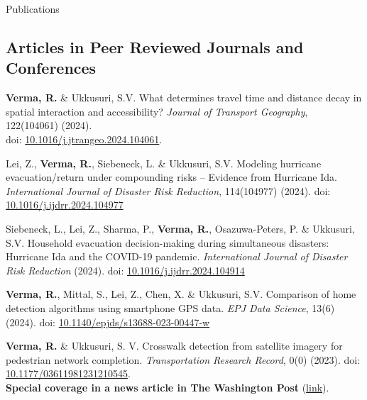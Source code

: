 \documentclass{CV} %
\begin{document}
\begin{rSection}{Publications}
    \subsection*{Articles in Peer Reviewed Journals and Conferences}
    \begin{etaremune}
        \item \textbf{Verma, R.} \& Ukkusuri, S.V. What determines travel time and distance decay in spatial interaction and accessibility? \textit{Journal of Transport Geography}, 122(104061) (2024).\\doi: \href{https://doi.org/10.1016/j.jtrangeo.2024.104061}{10.1016/j.jtrangeo.2024.104061}.

        \item Lei, Z., \textbf{Verma, R.}, Siebeneck, L. \& Ukkusuri, S.V. Modeling hurricane evacuation/return under compounding risks – Evidence from Hurricane Ida.  \textit{International Journal of Disaster Risk Reduction}, 114(104977) (2024). doi: \href{https://doi.org/10.1016/j.ijdrr.2024.104977}{10.1016/j.ijdrr.2024.104977}

        \item Siebeneck, L., Lei, Z., Sharma, P., \textbf{Verma, R.}, Osazuwa-Peters, P. \& Ukkusuri, S.V. Household evacuation decision-making during simultaneous disasters: Hurricane Ida and the COVID-19 pandemic.
        \textit{International Journal of Disaster Risk Reduction} (2024). doi: \href{https://doi.org/10.1016/j.ijdrr.2024.104914}{10.1016/j.ijdrr.2024.104914}

        \item \textbf{Verma, R.}, Mittal, S., Lei, Z., Chen, X. \& Ukkusuri, S.V. Comparison of home detection algorithms using smartphone GPS data.
        \textit{EPJ Data Science}, 13(6) (2024). doi: \href{https://doi.org/10.1140/epjds/s13688-023-00447-w}{10.1140/epjds/s13688-023-00447-w}
        
        \item \textbf{Verma, R.} \& Ukkusuri, S. V. Crosswalk detection from satellite imagery for pedestrian network completion. \textit{Transportation Research Record}, 0(0) (2023). doi: \href{https://doi.org/10.1177/03611981231210545}{10.1177/03611981231210545}.
        \\ \textbf{Special coverage in a news article in The Washington Post} (\href{https://www.washingtonpost.com/transportation/2023/02/25/sidewalks-crosswalks-study/}{link}).
        

\end{etaremune}
\end{rSection}
\end{document}
